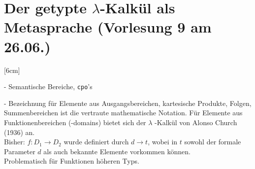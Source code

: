 \section{Der getypte $\lambda$-Kalkül als Metasprache \tiny (Vorlesung 9 am 26.06.)}
[6cm]
\begin{compactitem}
\item[-] Semantische Bereiche, \lstinline!cpo!'s
\item[-] Bezeichnung für Elemente aus Ausgangsbereichen, kartesische Produkte, Folgen, Summenbereichen ist die vertraute mathematische Notation. Für Elemente aus Funktionenbereichen (-domains) bietet sich der $\lambda$ -Kalkül von Alonso Church (1936) an.\\
Bisher: $f:D_1 \rightarrow D_2$ wurde definiert durch $d \rightarrow t$, wobei in $t$ sowohl der formale Parameter $d$ als auch bekannte Elemente vorkommen können.\\
Problematisch für Funktionen höheren Typs.
\end{compactitem}
